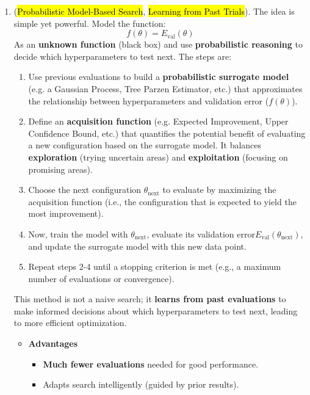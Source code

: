 \begin{enumerate}
    \item {} (\hl{Probabilistic Model-Based Search}, \hl{Learning from Past Trials}). The idea is simple yet powerful. Model the function:
    \begin{equation*}
        f\left(\theta\right) = E_{\text{val}}\left(\theta\right)
    \end{equation*}
    As an \textbf{unknown function} (black box) and use \textbf{probabilistic reasoning} to decide which hyperparameters to test next. The steps are:
    \begin{enumerate}
        \item Use previous evaluations to build a \textbf{probabilistic surrogate model} (e.g. a Gaussian Process, Tree Parzen Estimator, etc.) that approximates the relationship between hyperparameters and validation error ($f(\theta)$).
        \item Define an \textbf{acquisition function} (e.g. Expected Improvement, Upper Confidence Bound, etc.) that quantifies the potential benefit of evaluating a new configuration based on the surrogate model. It balances \textbf{exploration} (trying uncertain areas) and \textbf{exploitation} (focusing on promising areas).
        \item Choose the next configuration $\theta_{\text{next}}$ to evaluate by maximizing the acquisition function (i.e., the configuration that is expected to yield the most improvement).
        \item Now, train the model with $\theta_{\text{next}}$, evaluate its validation error\break $E_{\text{val}}(\theta_{\text{next}})$, and update the surrogate model with this new data point.
        \item Repeat steps 2-4 until a stopping criterion is met (e.g., a maximum number of evaluations or convergence).
    \end{enumerate}
    This method is not a naive search; it \textbf{learns from past evaluations} to make informed decisions about which hyperparameters to test next, leading to more efficient optimization.
    \begin{itemize}
        \item[\textcolor{Green3}{\faIcon{check}}] \textcolor{Green3}{\textbf{Advantages}}
        \begin{itemize}
            \item[\textcolor{Green3}{\faIcon{check}}] \textbf{Much fewer evaluations} needed for good performance.
            \item[\textcolor{Green3}{\faIcon{check}}] Adapts search intelligently (guided by prior results).

\end{itemize}
\end{itemize}
\end{enumerate}
